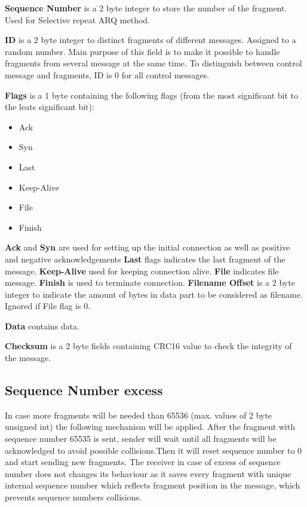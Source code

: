\documentclass{article}
\begin{document}
\textbf{Sequence Number} is a 2 byte integer to store the number of the fragment. Used for Selective repeat ARQ method. 
\newline

\textbf{ID}  is a 2 byte integer to distinct fragments of different messages. Assigned to a random number. Main purpose of this field is to make it possible to handle fragments from several message at the same time. To distinguish between control message and fragments, ID is 0 for all control messages.
\newline

\textbf{Flags}  is a 1 byte containing the following flags (from the most significant bit to the leats significant bit):
\begin{itemize}
  \item Ack  
  \item Syn
  \item Last
  \item Keep-Alive
  \item File  
  \item Finish

 
\end{itemize}
\textbf{Ack} and \textbf{Syn} are used for setting up the initial connection as well as positive and negative acknowledgements
\newline
\textbf{Last} flags indicates the last fragment of the message.
\newline
\textbf{Keep-Alive} used for keeping connection alive.
\newline
\textbf{File} indicates file message.
\newline
\textbf{Finish} is used to terminate connection.
\newline
\textbf{Filename Offset}  is a 2 byte integer to indicate the amount of bytes in data part to be considered as filename. Ignored if File flag is 0.
\newline

\textbf{Data} contains data.
\newline

\textbf{Checksum} is a 2 byte fields containing CRC16 value to check the integrity of the message.



\subsection{Sequence Number excess}
In case more fragments will be needed than 65536 (max. values of 2 byte unsigned int) the following mechanism will be applied. After the fragment with sequence number 65535 is sent, sender will wait until all fragments will be acknowledged  to avoid possible collisions.Then it will reset sequence number to 0 and start sending new fragments. The receiver in case of excess of sequence number does not changes its behaviour as it saves every fragment with unique internal sequence number which reflects fragment position in the message, which prevents sequence numbers collisions.
\end{document}
